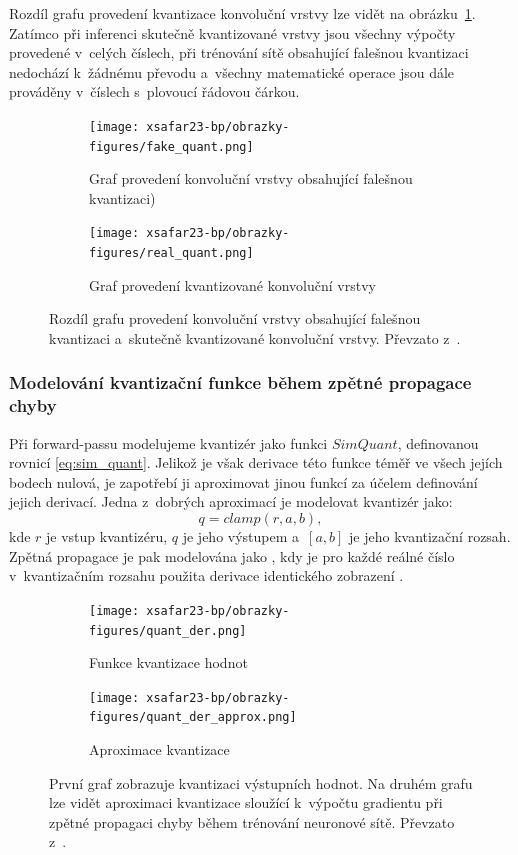 Rozdíl grafu provedení kvantizace konvoluční vrstvy lze vidět na obrázku~\ref{fig:real_vs_fake}. Zatímco při inferenci skutečně kvantizované vrstvy jsou všechny výpočty provedené v~celých číslech, při trénování sítě obsahující falešnou kvantizaci nedochází k~žádnému převodu a~všechny matematické operace jsou dále prováděny v~číslech s~plovoucí řádovou čárkou.

\begin{figure}[H]
\centering
\begin{subfigure}{.8\linewidth}
\centering
\texttt{[image: xsafar23-bp/obrazky-figures/fake\_quant.png]}
\caption[short]{Graf provedení konvoluční vrstvy obsahující falešnou kvantizaci)}
\end{subfigure}
\begin{subfigure}{.8\linewidth}
\centering
\texttt{[image: xsafar23-bp/obrazky-figures/real\_quant.png]}
\caption[short]{Graf provedení kvantizované konvoluční vrstvy}
\end{subfigure}
\caption{Rozdíl grafu provedení konvoluční vrstvy obsahující falešnou kvantizaci a~skutečně kvantizované konvoluční vrstvy. Převzato z~\cite{li2022mqbench}.}
    \label{fig:real_vs_fake}
\end{figure}

\subsubsection{Modelování kvantizační funkce během zpětné propagace chyby}

Při forward-passu modelujeme kvantizér jako funkci $SimQuant$, definovanou rovnicí \eqref{eq:sim_quant}. Jelikož je však derivace této funkce téměř ve všech jejích bodech nulová, je zapotřebí ji aproximovat jinou funkcí za účelem definování jejich derivací. Jedna z~dobrých aproximací je modelovat kvantizér \cite{krishnamoorthi2018quantizing} jako:
\begin{equation}
    q = clamp(r, a, b),
\end{equation}
kde $r$ je vstup kvantizéru, $q$ je jeho výstupem a~$[a,b]$ je jeho kvantizační rozsah. Zpětná propagace je pak modelována jako , kdy je pro každé reálné číslo v~kvantizačním rozsahu použita derivace identického zobrazení \cite{krishnamoorthi2018quantizing}.

\begin{figure}[H]
\centering
\begin{subfigure}{.45\linewidth}
\centering
\texttt{[image: xsafar23-bp/obrazky-figures/quant\_der.png]}
\caption[short]{Funkce kvantizace hodnot}
\end{subfigure}
\begin{subfigure}{.45\linewidth}
\centering
\texttt{[image: xsafar23-bp/obrazky-figures/quant\_der\_approx.png]}
\caption[short]{Aproximace kvantizace}
\end{subfigure}
\caption{První graf zobrazuje kvantizaci výstupních hodnot. Na druhém grafu lze vidět aproximaci kvantizace sloužící k~výpočtu gradientu při zpětné propagaci chyby během trénování neuronové sítě. Převzato z~\cite{krishnamoorthi2018quantizing}. }
    \label{fig:quant_derivace_approx}
\end{figure}


